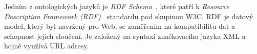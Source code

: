 Jedním z ontologických jazyků je \emph{RDF Schema}~\cite{rdf-schema}, které patří k \emph{Resource Description Framework (RDF)}~\cite{rdf} standardu pod skupinou W3C.
RDF je datový model, který byl navržený pro Web, se zaměřením na kompatibilitu dat a schopnost jejich sloučení.
Je založený na syntaxi značkovacího jazyka XML a hojně využívá URL adresy.
